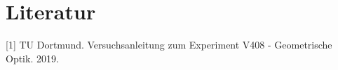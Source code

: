 \section{Literatur}

[1] TU Dortmund. Versuchsanleitung zum Experiment V408 - Geometrische Optik. 2019.